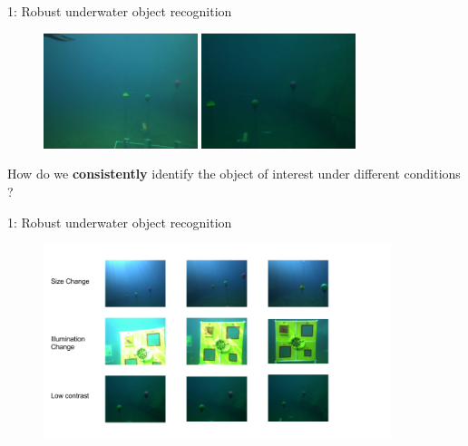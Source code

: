 \documentclass[13pt]{beamer}
\begin{document}
\begin{frame}{1: Robust underwater object recognition}

    \begin{figure}
        \centering
        \includegraphics[width=0.4\textwidth, height=0.3\textheight]{figs/problem1_1.png}\hspace{2em}
        \includegraphics[width=0.4\textwidth, height=0.3\textheight]{figs/problem1_2.jpg}
    \end{figure}

  How do we \textbf{consistently} identify the object of interest under
  different conditions ?

\end{frame}

\begin{frame}{1: Robust underwater object recognition}
  \begin{figure}[ht]
      \centering
      \includegraphics[width=0.9\textwidth, height=0.6\textwidth]{figs/data1.png}
  \end{figure}
\end{frame}
\end{document}
